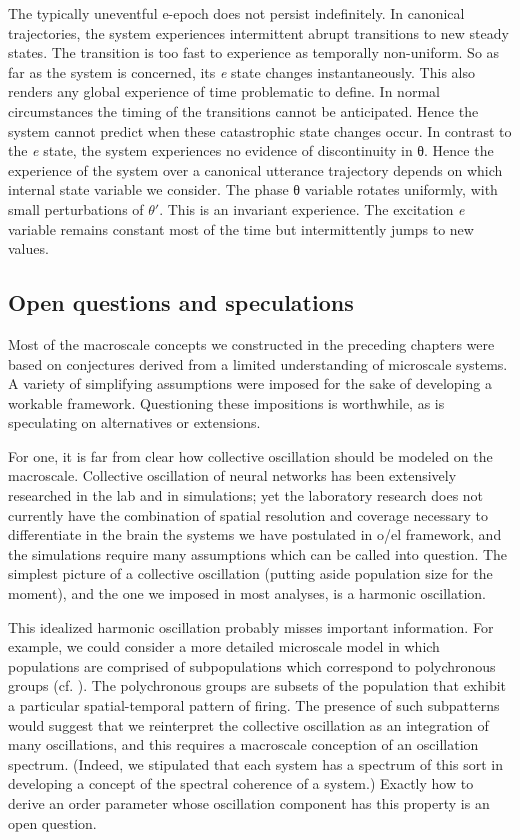   The typically uneventful e-epoch does not persist indefinitely. In canonical trajectories, the system experiences intermittent abrupt transitions to new steady states. The transition is too fast to experience as temporally non-uniform. So as far as the system is concerned, its \textit{e} state changes instantaneously. This also renders any global experience of time problematic to define. In normal circumstances the timing of the transitions cannot be anticipated. Hence the system cannot predict when these catastrophic state changes occur. In contrast to the \textit{e} state, the system experiences no evidence of discontinuity in θ. Hence the experience of the system over a canonical utterance trajectory depends on which internal state variable we consider. The phase θ variable rotates uniformly, with small perturbations of $\theta ′$. This is an invariant experience. The excitation \textit{e} variable remains constant most of the time but intermittently jumps to new values. 

\subsection{Open questions and speculations}

Most of the macroscale concepts we constructed in the preceding chapters were based on conjectures derived from a limited understanding of microscale systems. A variety of simplifying assumptions were imposed for the sake of developing a workable framework. Questioning these impositions is worthwhile, as is speculating on alternatives or extensions.

  For one, it is far from clear how collective oscillation should be modeled on the macroscale. Collective oscillation of neural networks has been extensively researched in the lab and in simulations; yet the laboratory research does not currently have the combination of spatial resolution and coverage necessary to differentiate in the brain the systems we have postulated in o/el framework, and the simulations require many assumptions which can be called into question. The simplest picture of a collective oscillation (putting aside population size for the moment), and the one we imposed in most analyses, is a harmonic oscillation.

  This idealized harmonic oscillation probably misses important information. For example, we could consider a more detailed microscale model in which populations are comprised of subpopulations which correspond to polychronous groups (cf. \citealt{Izhikevich2006}). The polychronous groups are subsets of the population that exhibit a particular spatial-temporal pattern of firing. The presence of such subpatterns would suggest that we reinterpret the collective oscillation as an integration of many oscillations, and this requires a macroscale conception of an oscillation spectrum. (Indeed, we stipulated that each system has a spectrum of this sort in developing a concept of the spectral coherence of a system.) Exactly how to derive an order parameter whose oscillation component has this property is an open question.

